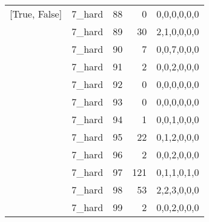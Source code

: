 \begin{tabular}{llrrl}
 [True, False]   & 7\_hard              &            88 &                     0 & 0,0,0,0,0,0   \\
 [True, False]   & 7\_hard              &            89 &                    30 & 2,1,0,0,0,0   \\
 [True, False]   & 7\_hard              &            90 &                     7 & 0,0,7,0,0,0   \\
 [True, False]   & 7\_hard              &            91 &                     2 & 0,0,2,0,0,0   \\
 [True, False]   & 7\_hard              &            92 &                     0 & 0,0,0,0,0,0   \\
 [True, False]   & 7\_hard              &            93 &                     0 & 0,0,0,0,0,0   \\
 [True, False]   & 7\_hard              &            94 &                     1 & 0,0,1,0,0,0   \\
 [True, False]   & 7\_hard              &            95 &                    22 & 0,1,2,0,0,0   \\
 [True, False]   & 7\_hard              &            96 &                     2 & 0,0,2,0,0,0   \\
 [True, False]   & 7\_hard              &            97 &                   121 & 0,1,1,0,1,0   \\
 [True, False]   & 7\_hard              &            98 &                    53 & 2,2,3,0,0,0   \\
 [True, False]   & 7\_hard              &            99 &                     2 & 0,0,2,0,0,0   \\
\hline
\end{tabular}